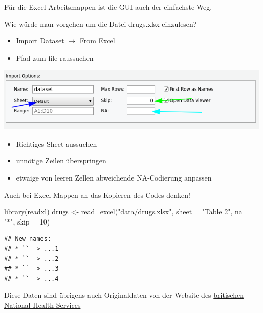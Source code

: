 \documentclass[
]{book}
\newenvironment{Shaded}{\begin{snugshade}}{\end{snugshade}}
\newcommand{\AttributeTok}[1]{\textcolor[rgb]{0.77,0.63,0.00}{#1}}
\newcommand{\DecValTok}[1]{\textcolor[rgb]{0.00,0.00,0.81}{#1}}
\newcommand{\FunctionTok}[1]{\textcolor[rgb]{0.00,0.00,0.00}{#1}}
\newcommand{\NormalTok}[1]{#1}
\newcommand{\OtherTok}[1]{\textcolor[rgb]{0.56,0.35,0.01}{#1}}
\newcommand{\StringTok}[1]{\textcolor[rgb]{0.31,0.60,0.02}{#1}}
\providecommand{\tightlist}{%
  \setlength{\itemsep}{0pt}\setlength{\parskip}{0pt}}
\begin{document}
Für die Excel-Arbeitsmappen ist die GUI auch der einfachste Weg.

Wie würde man vorgehen um die Datei drugs.xlsx einzulesen?

\begin{itemize}
\tightlist
\item
  Import Dataset \(\rightarrow\) From Excel
\item
  Pfad zum file raussuchen
\end{itemize}

\begin{center}\includegraphics[width=0.8\linewidth]{imgs/excel1} \end{center}

\begin{itemize}
\tightlist
\item
  Richtiges Sheet aussuchen
\item
  unnötige Zeilen überspringen
\item
  etwaige von leeren Zellen abweichende NA-Codierung anpassen
\end{itemize}

Auch bei Excel-Mappen an das Kopieren des Codes denken!

\begin{Shaded}
\begin{Highlighting}[]
\FunctionTok{library}\NormalTok{(readxl)}
\NormalTok{drugs }\OtherTok{\textless{}{-}} \FunctionTok{read\_excel}\NormalTok{(}\StringTok{"data/drugs.xlsx"}\NormalTok{,}
                    \AttributeTok{sheet =} \StringTok{"Table 2"}\NormalTok{, }\AttributeTok{na =} \StringTok{"*"}\NormalTok{, }\AttributeTok{skip =} \DecValTok{10}\NormalTok{)}
\end{Highlighting}
\end{Shaded}

\begin{verbatim}
## New names:
## * `` -> ...1
## * `` -> ...2
## * `` -> ...3
## * `` -> ...4
\end{verbatim}

Diese Daten sind übrigens auch Originaldaten von der Website des \href{https://digital.nhs.uk/data-and-information/publications/statistical/statistics-on-drug-misuse/2018}{britischen National Health Services}
\end{document}
